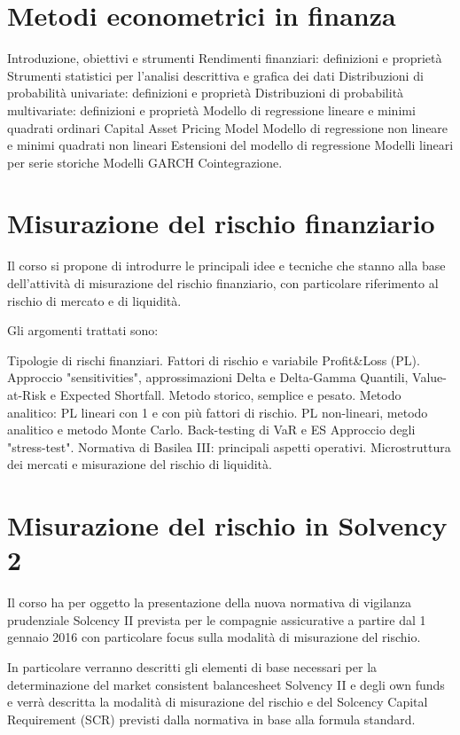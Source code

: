 \section{Metodi econometrici in finanza}
Introduzione, obiettivi e strumenti
Rendimenti finanziari: definizioni e proprietà
Strumenti statistici per l’analisi descrittiva e grafica dei dati
Distribuzioni di probabilità univariate: definizioni e proprietà
Distribuzioni di probabilità multivariate: definizioni e proprietà
Modello di regressione lineare e minimi quadrati ordinari
Capital Asset Pricing Model
Modello di regressione non lineare e minimi quadrati non lineari
Estensioni del modello di regressione
Modelli lineari per serie storiche
Modelli GARCH
Cointegrazione.

\section{Misurazione del rischio finanziario}
Il corso si propone di introdurre le principali idee e tecniche che stanno alla base dell'attività di misurazione del rischio finanziario, con particolare riferimento al rischio di mercato e di liquidità.

Gli argomenti trattati sono:

Tipologie di rischi finanziari.
Fattori di rischio e variabile Profit\&Loss (PL).
Approccio "sensitivities", approssimazioni Delta e Delta-Gamma Quantili, Value-at-Risk e Expected Shortfall.
Metodo storico, semplice e pesato.
Metodo analitico: PL lineari con 1 e con più fattori di rischio.
PL non-lineari, metodo analitico e metodo Monte Carlo.
Back-testing di VaR e ES Approccio degli "stress-test".
Normativa di Basilea III: principali aspetti operativi.
Microstruttura dei mercati e misurazione del rischio di liquidità.

\section{Misurazione del rischio in Solvency 2}
Il corso ha per oggetto la presentazione della nuova normativa di vigilanza prudenziale Solcency II prevista per le compagnie assicurative a partire dal 1 gennaio 2016 con particolare focus sulla modalità di misurazione del rischio.

In particolare verranno descritti gli elementi di base necessari per la determinazione del market consistent balancesheet Solvency II e degli own funds e verrà descritta la modalità di misurazione del rischio e del Solcency Capital Requirement (SCR) previsti dalla normativa in base alla formula standard.

